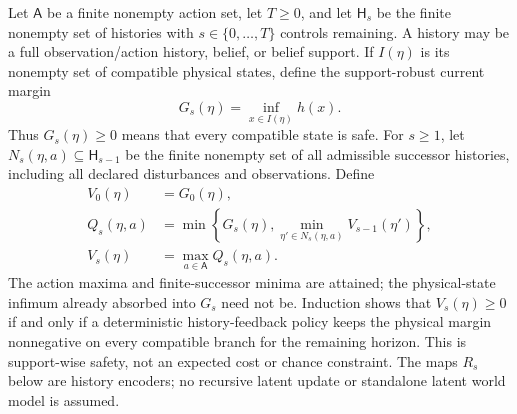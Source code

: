 Let $\mathsf A$ be a finite nonempty action set, let $T\geq0$, and let $\mathsf H_s$ be the finite
nonempty set of histories with $s\in\{0,\ldots,T\}$ controls remaining.  A history may be a
full observation/action history, belief, or belief support.  If $I(\eta)$ is its nonempty set of
compatible physical states, define the support-robust current margin
\[
  G_s(\eta)=\inf_{x\in I(\eta)}h(x).
\]
Thus $G_s(\eta)\geq0$ means that every compatible state is safe.  For $s\geq1$, let
$N_s(\eta,a)\subseteq\mathsf H_{s-1}$ be the finite nonempty set of all admissible successor
histories, including all declared disturbances and observations.  Define
\begin{align}
 V_0(\eta)&=G_0(\eta),\nonumber\\
 Q_s(\eta,a)
 &=\min\left\{G_s(\eta),\min_{\eta'\in N_s(\eta,a)}V_{s-1}(\eta')\right\},
 \label{eq:robust-history-q}\\
 V_s(\eta)&=\max_{a\in\mathsf A}Q_s(\eta,a).\nonumber
\end{align}
The action maxima and finite-successor minima are attained; the physical-state infimum already
absorbed into $G_s$ need not be.  Induction shows that $V_s(\eta)\geq0$ if and only if a deterministic
history-feedback policy keeps the physical margin nonnegative on every compatible branch for the
remaining horizon.  This is support-wise safety, not an expected cost or chance constraint.
The maps $R_s$ below are history encoders; no recursive latent update or standalone latent world
model is assumed.

